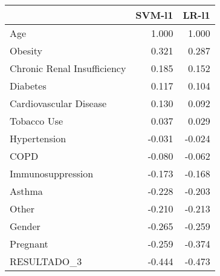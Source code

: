 \begin{tabular}{lrr}
\toprule
{} &  SVM-l1 &  LR-l1 \\
\midrule
Age                         &   1.000 &  1.000 \\
Obesity                     &   0.321 &  0.287 \\
Chronic Renal Insufficiency &   0.185 &  0.152 \\
Diabetes                    &   0.117 &  0.104 \\
Cardiovascular Disease      &   0.130 &  0.092 \\
Tobacco Use                 &   0.037 &  0.029 \\
Hypertension                &  -0.031 & -0.024 \\
COPD                        &  -0.080 & -0.062 \\
Immunosuppression           &  -0.173 & -0.168 \\
Asthma                      &  -0.228 & -0.203 \\
Other                       &  -0.210 & -0.213 \\
Gender                      &  -0.265 & -0.259 \\
Pregnant                    &  -0.259 & -0.374 \\
RESULTADO\_3                 &  -0.444 & -0.473 \\
\bottomrule
\end{tabular}
